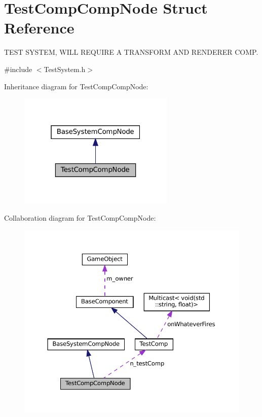 \hypertarget{structTestCompCompNode}{}\section{Test\+Comp\+Comp\+Node Struct Reference}
\label{structTestCompCompNode}


T\+E\+ST S\+Y\+S\+T\+EM, W\+I\+LL R\+E\+Q\+U\+I\+RE A T\+R\+A\+N\+S\+F\+O\+RM A\+ND R\+E\+N\+D\+E\+R\+ER C\+O\+MP.  




{\ttfamily \#include $<$Test\+System.\+h$>$}



Inheritance diagram for Test\+Comp\+Comp\+Node\+:
\nopagebreak
\begin{figure}[H]
\begin{center}
\leavevmode
\includegraphics[width=211pt]{structTestCompCompNode__inherit__graph}
\end{center}
\end{figure}


Collaboration diagram for Test\+Comp\+Comp\+Node\+:
\nopagebreak
\begin{figure}[H]
\begin{center}
\leavevmode
\includegraphics[width=350pt]{structTestCompCompNode__coll__graph}
\end{center}
\end{figure}
